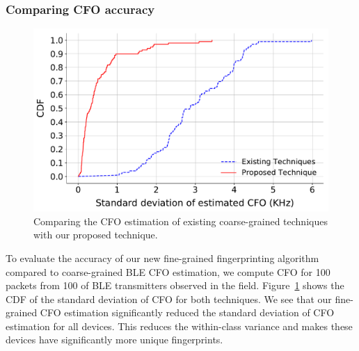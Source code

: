 \fi

\subsubsection{Comparing CFO accuracy} %
\begin{figure}[t!]
    \centering
    \includegraphics[width = \linewidth]{plots/CFO_comparison_ESP.pdf} 
    \caption{Comparing the CFO estimation of existing coarse-grained techniques with our proposed technique.}
    \label{fig:cfo_comp}
\end{figure}


%
To evaluate the accuracy of our new fine-grained fingerprinting algorithm compared to coarse-grained BLE
CFO estimation, 
we compute CFO for 100 packets from 100 of BLE transmitters observed in the field.%
%
Figure~\ref{fig:cfo_comp} shows the CDF of the standard deviation of CFO for both techniques.
%
We see that 
our fine-grained CFO estimation significantly reduced the standard deviation of CFO estimation for all devices. This reduces the within-class variance and
makes these devices have significantly more unique fingerprints.
%

